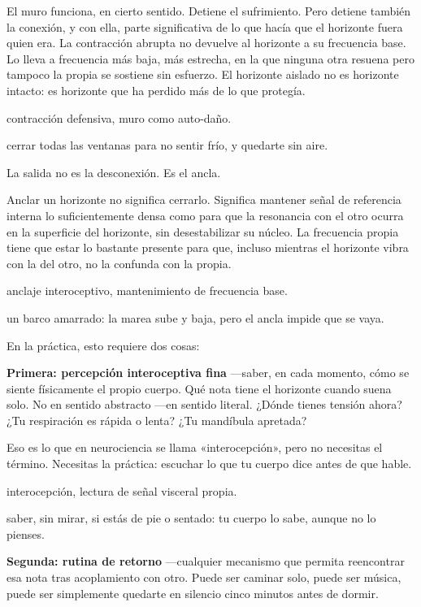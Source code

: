El muro funciona, en cierto sentido. Detiene el sufrimiento. Pero detiene también la conexión, y con ella, parte significativa de lo que hacía que el horizonte fuera quien era. La contracción abrupta no devuelve al horizonte a su frecuencia base. Lo lleva a frecuencia más baja, más estrecha, en la que ninguna otra resuena pero tampoco la propia se sostiene sin esfuerzo. El horizonte aislado no es horizonte intacto: es horizonte que ha perdido más de lo que protegía.

\begin{fisica}
 contracción defensiva, muro como auto-daño.

 cerrar todas las ventanas para no sentir frío, y quedarte sin aire.
\end{fisica}
\noindent La salida no es la desconexión. Es el ancla.

Anclar un horizonte no significa cerrarlo. Significa mantener señal de referencia interna lo suficientemente densa como para que la resonancia con el otro ocurra en la superficie del horizonte, sin desestabilizar su núcleo. La frecuencia propia tiene que estar lo bastante presente para que, incluso mientras el horizonte vibra con la del otro, no la confunda con la propia.

\begin{fisica}
 anclaje interoceptivo, mantenimiento de frecuencia base.

 un barco amarrado: la marea sube y baja, pero el ancla impide que se vaya.
\end{fisica}
En la práctica, esto requiere dos cosas:

\textbf{Primera: percepción interoceptiva fina} —saber, en cada momento, cómo se siente físicamente el propio cuerpo. Qué nota tiene el horizonte cuando suena solo. No en sentido abstracto —en sentido literal. ¿Dónde tienes tensión ahora? ¿Tu respiración es rápida o lenta? ¿Tu mandíbula apretada?

Eso es lo que en neurociencia se llama «interocepción», pero no necesitas el término. Necesitas la práctica: escuchar lo que tu cuerpo dice antes de que hable.

\begin{fisica}
 interocepción, lectura de señal visceral propia.

 saber, sin mirar, si estás de pie o sentado: tu cuerpo lo sabe, aunque no lo pienses.
\end{fisica}
\textbf{Segunda: rutina de retorno} —cualquier mecanismo que permita reencontrar esa nota tras acoplamiento con otro. Puede ser caminar solo, puede ser música, puede ser simplemente quedarte en silencio cinco minutos antes de dormir.

